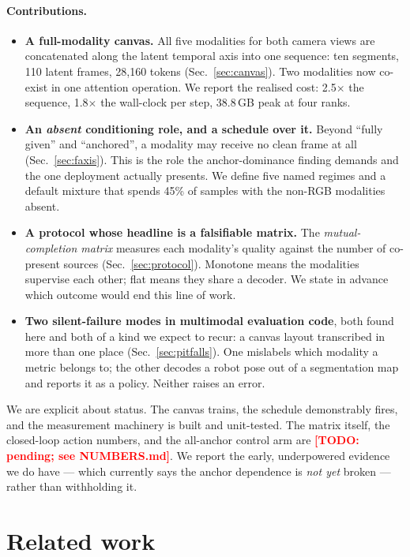 \documentclass{article}
\newcommand{\TODO}[1]{\textcolor{red}{\textbf{[TODO: #1]}}}
\begin{document}
\paragraph{Contributions.}
\begin{itemize}
\item \textbf{A full-modality canvas.} All five modalities for both camera views are concatenated
      along the latent temporal axis into one sequence: ten segments, 110 latent frames, 28{,}160
      tokens (Sec.~\ref{sec:canvas}). Two modalities now co-exist in one attention operation. We
      report the realised cost: 2.5$\times$ the sequence, 1.8$\times$ the wall-clock per step,
      38.8\,GB peak at four ranks.
\item \textbf{An \emph{absent} conditioning role, and a schedule over it.} Beyond
      ``fully given'' and ``anchored'', a modality may receive no clean frame at all
      (Sec.~\ref{sec:faxis}). This is the role the anchor-dominance finding demands and the one
      deployment actually presents. We define five named regimes and a default mixture that
      spends 45\% of samples with the non-RGB modalities absent.
\item \textbf{A protocol whose headline is a falsifiable matrix.} The
      \emph{mutual-completion matrix} measures each modality's quality against the number of
      co-present sources (Sec.~\ref{sec:protocol}). Monotone means the modalities supervise each
      other; flat means they share a decoder. We state in advance which outcome would end this
      line of work.
\item \textbf{Two silent-failure modes in multimodal evaluation code}, both found here and both
      of a kind we expect to recur: a canvas layout transcribed in more than one place
      (Sec.~\ref{sec:pitfalls}). One mislabels which modality a metric belongs to; the other
      decodes a robot pose out of a segmentation map and reports it as a policy. Neither raises
      an error.
\end{itemize}

We are explicit about status. The canvas trains, the schedule demonstrably fires, and the
measurement machinery is built and unit-tested. The matrix itself, the closed-loop action
numbers, and the all-anchor control arm are \TODO{pending; see NUMBERS.md}. We report the
early, underpowered evidence we do have --- which currently says the anchor dependence is
\emph{not yet} broken --- rather than withholding it.

\section{Related work}
\label{sec:related}
\end{document}
